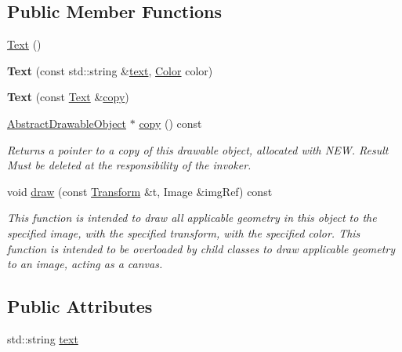 \subsection*{Public Member Functions}
\begin{DoxyCompactItemize}
\item 
\hyperlink{classcturtle_1_1Text_aad06f49d01be75cbfafedb64a38cfc29}{Text} ()
\item 
\mbox{\label{classcturtle_1_1Text_a9adab9abc546c76b39feb594e0f4de1a}} 
{\bfseries Text} (const std\+::string \&\hyperlink{classcturtle_1_1Text_ac631d8199ccd9ae56f661e22acc157d9}{text}, \hyperlink{classcturtle_1_1Color}{Color} color)
\item 
\mbox{\label{classcturtle_1_1Text_acea0ae681ef02899079547d852810687}} 
{\bfseries Text} (const \hyperlink{classcturtle_1_1Text}{Text} \&\hyperlink{classcturtle_1_1Text_acb0908ae70d1194d6e47a8f8ba51461a}{copy})
\item 
\mbox{\label{classcturtle_1_1Text_acb0908ae70d1194d6e47a8f8ba51461a}} 
\hyperlink{classcturtle_1_1AbstractDrawableObject}{Abstract\+Drawable\+Object} $\ast$ \hyperlink{classcturtle_1_1Text_acb0908ae70d1194d6e47a8f8ba51461a}{copy} () const
\begin{DoxyCompactList}\small\item\em Returns a pointer to a copy of this drawable object, allocated with N\+EW. Result Must be deleted at the responsibility of the invoker. \end{DoxyCompactList}\item 
void \hyperlink{classcturtle_1_1Text_a80003e4c447def1c7de8daf29a8fc5ec}{draw} (const \hyperlink{classcturtle_1_1Transform}{Transform} \&t, Image \&img\+Ref) const
\begin{DoxyCompactList}\small\item\em This function is intended to draw all applicable geometry in this object to the specified image, with the specified transform, with the specified color. This function is intended to be overloaded by child classes to draw applicable geometry to an image, acting as a canvas. \end{DoxyCompactList}\end{DoxyCompactItemize}
\subsection*{Public Attributes}
\begin{DoxyCompactItemize}
\item 
std\+::string \hyperlink{classcturtle_1_1Text_ac631d8199ccd9ae56f661e22acc157d9}{text}
\end{DoxyCompactItemize}


